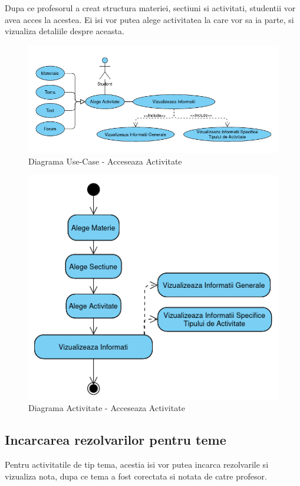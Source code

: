 \documentclass[12pt, a4paper, oneside, romanian]{teza-upb}
\begin{document}
Dupa ce profesorul a creat structura materiei, sectiuni si activitati, studentii vor avea acces la acestea. Ei isi vor putea alege activitatea la care vor sa ia parte, si vizualiza detaliile despre aceasta.

\begin{figure}[H]
\centering
\includegraphics*[width=\columnwidth]{diagrama-use-case-acceseaza-activitate}
\caption{Diagrama Use-Case - Acceseaza Activitate}
\label{diagrama-use-case-acceseaza-activitate}
\end{figure}


\begin{figure}[H]
\centering
\includegraphics*[width=0.6\columnwidth]{diagrama-activitate-acceseaza-activitate}
\caption{Diagrama Activitate - Acceseaza Activitate}
\label{diagrama-activitate-acceseaza-activitate}
\end{figure}

\subsection{Incarcarea rezolvarilor pentru teme}

Pentru activitatile de tip tema, acestia isi vor putea incarca rezolvarile si vizualiza nota, dupa ce tema a fost corectata si notata de catre profesor.
\end{document}
